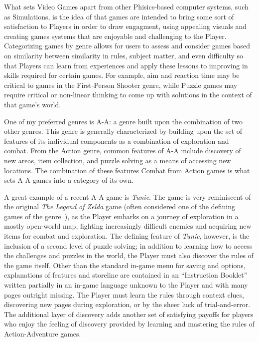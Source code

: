What sets Video Games apart from other Phisics-based computer systems, such as Simulations, is the idea of that games are intended to bring some sort of satisfaction to Players in order to draw engagment, using appealing visuals and creating games systems that are enjoyable and challenging to the Player. Categorizing games by genre allows for users to assess and consider games based on similarity between similarity in rules, subject matter, and even difficulty so that Players can learn from experiences and apply these lessons to improving in skills required for certain games. For example, aim and reaction time may be critical to games in the First-Person Shooter genre, while Puzzle games may require critical or non-linear thinking to come up with solutions in the context of that game’s world.

One of my preferred genres is \ac{A-A}: a genre built upon the combination of two other genres. This genre is generally characterized by building upon the set of features of its individual components as a combination of exploration and combat. From the Action genre, common features of \ac{A-A} include discovery of new areas, item collection, and puzzle solving as a means of accessing new locations. The combination of these features Combat from Action games is what sets \ac{A-A} games into a category of its own.

A great example of a recent \ac{A-A} game is \textit{Tunic}. The game is very reminiscent of the original \textit{The Legend of Zelda} game (often considered one of the defining games of the genre~\cite{b4}), as the Player embarks on a journey of exploration in a mostly open-world map, fighting increasingly difficult enemies and acquiring new items for combat and exploration. The defining feature of \textit{Tunic}, however, is the inclusion of a second level of puzzle solving; in addition to learning how to access the challenges and puzzles in the world, the Player must also discover the rules of the game itself. Other than the standard in-game menu for saving and options, explanations of features and storeline are contained in an “Instruction Booklet” written partially in an in-game language unknown to the Player and with many pages outright missing. The Player must learn the rules through context clues, discovering new pages during exploration, or by the sheer luck of trial-and-error. The additional layer of discovery adds another set of satisfying payoffs for players who enjoy the feeling of discovery provided by learning and mastering the rules of Action-Adventure games.

